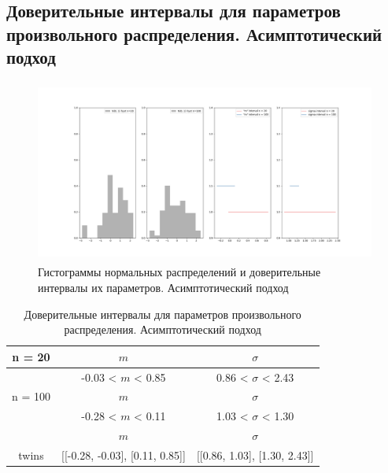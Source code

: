 \subsection{Доверительные интервалы для параметров произвольного распределения. Асимптотический подход}
\begin{figure}[H]
	\centering
	\includegraphics[width = 18cm, height = 6cm]{resources/8_2.png}
	\caption{Гистограммы нормальных распределений и доверительные интервалы их параметров. Асимптотический подход}
	\label{w_pert}
\end{figure}

\begin{table}[H]
	\centering
	\begin{tabular}{| c | c | c |}
		\hline
		n = 20   &  $m$  & $\sigma$\\ \hline
		&  -0.03 < $m$ < 0.85 & 0.86 < $\sigma$ < 2.43 \\ \hline
		n = 100   &  $m$  & $\sigma$\\ \hline
		& -0.28 < $m$ < 0.11 & 1.03 < $\sigma$ < 1.30 \\ \hline
		&  $m$ & $\sigma$\\ \hline
		twins & [[-0.28, -0.03], [0.11, 0.85]] & [[0.86, 1.03], [1.30, 2.43]] \\
		\hline
	\end{tabular}
	\caption{Доверительные интервалы для параметров произвольного распределения. Асимптотический подход}
	\label{tab:interv_asimpt}
\end{table}

\newpage